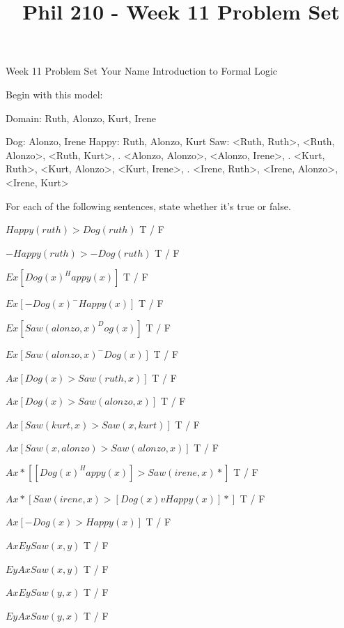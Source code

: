 
\title{Phil 210 - Week 11 Problem Set}

\heading
Week 11 Problem Set
Your Name
Introduction to Formal Logic
\endheading

Begin with this model:

\answer
        \firstordermodel 
        Domain: Ruth, Alonzo, Kurt, Irene

        Dog:    Alonzo, Irene
        Happy:  Ruth, Alonzo, Kurt
        Saw:    <Ruth, Ruth>, <Ruth, Alonzo>, <Ruth, Kurt>,
           .    <Alonzo, Alonzo>, <Alonzo, Irene>,
           .    <Kurt, Ruth>, <Kurt, Alonzo>, <Kurt, Irene>,
           .    <Irene, Ruth>, <Irene, Alonzo>, <Irene, Kurt>
        \endfirstordermodel
\endanswer\bigskip

For each of the following sentences, state whether it's true or false.

\quantifiers
\problems
{}
$ Happy(ruth) > Dog(ruth) $
        \answer
         T / F
        \endanswer

$ -Happy(ruth) > -Dog(ruth) $
        \answer
         T / F
        \endanswer

$ Ex[Dog(x) ^ Happy(x)] $
        \answer
         T / F
        \endanswer

$ Ex[-Dog(x) ^ -Happy(x)] $
        \answer
         T / F
        \endanswer

$ Ex[Saw(alonzo,x) ^ Dog(x)] $
        \answer
         T / F
        \endanswer

$ Ex[Saw(alonzo,x) ^ -Dog(x)] $
        \answer
         T / F
        \endanswer

$ Ax[Dog(x) > Saw(ruth,x)] $
        \answer
         T / F
        \endanswer

$ Ax[Dog(x) > Saw(alonzo,x)] $
        \answer
         T / F
        \endanswer

$ Ax[Saw(kurt,x) > Saw(x,kurt)] $
        \answer
         T / F
        \endanswer

$ Ax[Saw(x,alonzo) > Saw(alonzo,x)] $
        \answer
         T / F
        \endanswer

$ Ax*[[Dog(x) ^ Happy(x)] > Saw(irene,x)*] $
        \answer
         T / F
        \endanswer

$ Ax*[Saw(irene,x) > [Dog(x) v Happy(x)]*] $
        \answer
         T / F
        \endanswer

$ Ax[-Dog(x) > Happy(x)] $
        \answer
         T / F
        \endanswer

$ Ax Ey Saw(x,y) $
        \answer
         T / F
        \endanswer

$ Ey Ax Saw(x,y) $
        \answer
         T / F
        \endanswer

$ Ax Ey Saw(y,x) $
        \answer
         T / F
        \endanswer

$ Ey Ax Saw(y,x) $
        \answer
         T / F
        \endanswer

\endproblems
\bye
